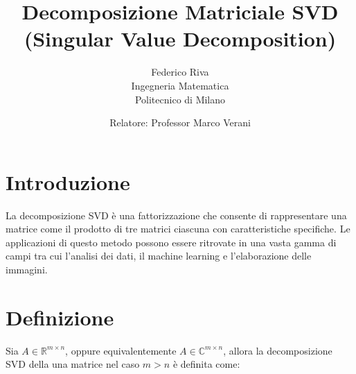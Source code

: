 \documentclass[11pt]{article}
\begin{document}
\title{Decomposizione Matriciale SVD \\ (Singular Value Decomposition)}
\author{Federico Riva\\Ingegneria Matematica\\Politecnico di Milano}
\date{Relatore: Professor Marco Verani}

\maketitle
\newpage
\tableofcontents
\newpage
\section{Introduzione}
La decomposizione SVD è una fattorizzazione che consente di rappresentare una matrice come il prodotto di tre matrici ciascuna con caratteristiche specifiche. Le applicazioni di questo metodo possono essere ritrovate in una vasta gamma di campi tra cui l'analisi dei dati, il machine learning e l'elaborazione delle immagini.


\section{Definizione}
Sia $A\in\mathbb{R}^{m\times n}$, oppure equivalentemente $A\in\mathbb{C}^{m\times n}$, allora la decomposizione SVD della una matrice nel caso $m>n$ è definita come:
\end{document}
